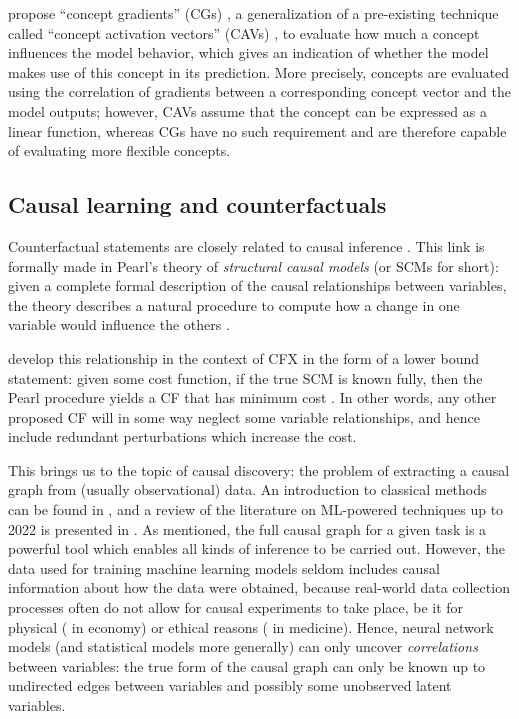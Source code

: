 \documentclass[../main.tex]{subfiles}
\begin{document}
\citeauthor{baiConcept2022} propose ``concept gradients'' (CGs) \cite{baiConcept2022}, a generalization of a pre-existing technique called ``concept activation vectors'' (CAVs) \cite{kimInterpretability2018}, to evaluate how much a concept influences the model behavior, which gives an indication of whether the model makes use of this concept in its prediction.
More precisely, concepts are evaluated using the correlation of gradients between a corresponding concept vector and the model outputs; however, CAVs assume that the concept can be expressed as a linear function, whereas CGs have no such requirement and are therefore capable of evaluating more flexible concepts.

\subsection{Causal learning and counterfactuals}

Counterfactual statements are closely related to causal inference \cite{morganCounterfactuals2015}.
This link is formally made in Pearl's theory of \emph{structural causal models} (or SCMs for short): given a complete formal description of the causal relationships between variables, the theory describes a natural procedure to compute how a change in one variable would influence the others \cite{pearlCausal2016}.

\citeauthor{karimiAlgorithmic2020} develop this relationship in the context of CFX in the form of a lower bound statement: given some cost function, if the true SCM is known fully, then the Pearl procedure yields a CF that has minimum cost \cite{karimiAlgorithmic2020}.
In other words, any other proposed CF will in some way neglect some variable relationships, and hence include redundant perturbations which increase the cost.

This brings us to the topic of causal discovery: the problem of extracting a causal graph from (usually observational) data.
An introduction to classical methods can be found in \cite{cunninghamCausal2021}, and a review of the literature on ML-powered techniques up to 2022 is presented in \cite{vowelsYa2023}.
As mentioned, the full causal graph for a given task is a powerful tool which enables all kinds of inference to be carried out.
However, the data used for training machine learning models seldom includes causal information about how the data were obtained, because real-world data collection processes often do not allow for causal experiments to take place, be it for physical (\eg{} in economy) or ethical reasons (\eg{} in medicine).
Hence, neural network models (and statistical models more generally) can only uncover \emph{correlations} between variables: the true form of the causal graph can only be known up to undirected edges between variables and possibly some unobserved latent variables.
\end{document}
